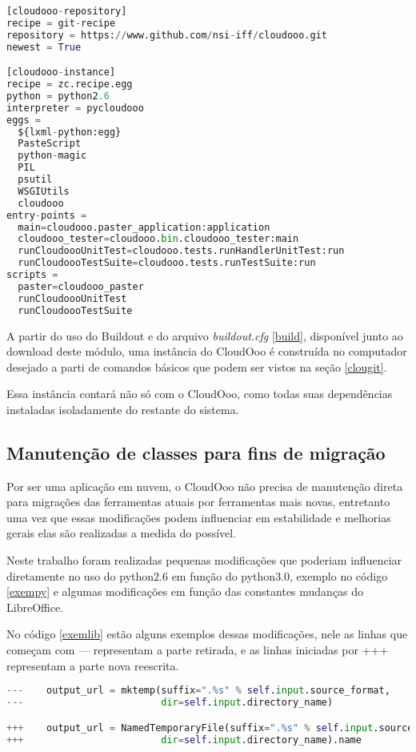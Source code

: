 {\begin{lstlisting}[caption=Arquivo de configuração do cloudooo buildout,language=python,label={build}]
[cloudooo-repository]
recipe = git-recipe
repository = https://www.github.com/nsi-iff/cloudooo.git
newest = True

[cloudooo-instance]
recipe = zc.recipe.egg
python = python2.6
interpreter = pycloudooo
eggs =
  ${lxml-python:egg}
  PasteScript
  python-magic
  PIL
  psutil
  WSGIUtils
  cloudooo
entry-points =
  main=cloudooo.paster_application:application
  cloudooo_tester=cloudooo.bin.cloudooo_tester:main
  runCloudoooUnitTest=cloudooo.tests.runHandlerUnitTest:run
  runCloudoooTestSuite=cloudooo.tests.runTestSuite:run
scripts = 
  paster=cloudooo_paster
  runCloudoooUnitTest
  runCloudoooTestSuite
\end{lstlisting}
}

A partir do uso do Buildout e do arquivo \textit{buildout.cfg} \ref{build}, disponível junto ao download deste módulo, uma instância do CloudOoo é construída no computador desejado a parti de comandos básicos que podem ser vistos na seção \ref{clougit}.

Essa instância contará não só com o CloudOoo, como todas suas dependências instaladas isoladamente do restante do sistema.

\subsection{Manutenção de classes para fins de migração}

Por ser uma aplicação em nuvem, o CloudOoo não precisa de manutenção direta para migrações das ferramentas atuais por ferramentas mais novas, entretanto uma vez que essas modificações podem influenciar em estabilidade e melhorias gerais elas são realizadas a medida do possível.

Neste trabalho foram realizadas pequenas modificações que poderiam influenciar diretamente no uso do python2.6 em função do python3.0, exemplo no código \ref{exempy} e algumas modificações em função das constantes mudanças do LibreOffice.

No código \ref{exemlib} estão alguns exemplos dessas modificações, nele as linhas que começam com --- representam a parte retirada, e as linhas iniciadas por +++ representam a parte nova reescrita.

{\singlespace
\begin{lstlisting}[caption=Exemplo de modificação para Python 3,language=python,label={exempy}]
---    output_url = mktemp(suffix=".%s" % self.input.source_format,
---                        dir=self.input.directory_name)

+++    output_url = NamedTemporaryFile(suffix=".%s" % self.input.source_format,
+++                        dir=self.input.directory_name).name
\end{lstlisting}
}


